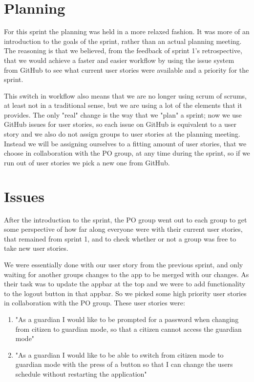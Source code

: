 \section{Planning}\label{sprint2Planning}
For this sprint the planning was held in a more relaxed fashion.
It was more of an introduction to the goals of the sprint, rather than an actual planning meeting.
The reasoning is that we believed, from the feedback of sprint 1's retrospective, that we would achieve a faster and easier workflow by using the issue system from GitHub to see what current user stories were available and a priority for the sprint.

This switch in workflow also means that we are no longer using scrum of scrums, at least not in a traditional sense, but we are using a lot of the elements that it provides.
The only "real" change is the way that we "plan" a sprint; now we use GitHub issues for user stories, so each issue on GitHub is equivalent to a user story and we also do not assign groups to user stories at the planning meeting.
Instead we will be assigning ourselves to a fitting amount of user stories, that we choose in collaboration with the PO group, at any time during the sprint, so if we run out of user stories we pick a new one from GitHub.

\section{Issues}\label{sprint2planstories}
After the introduction to the sprint, the PO group went out to each group to get some perspective of how far along everyone were with their current user stories, that remained from sprint 1, and to check whether or not a group was free to take new user stories.

We were essentially done with our user story from the previous sprint, and only waiting for another groups changes to the app to be merged with our changes.
As their task was to update the appbar at the top and we were to add functionality to the logout button in that appbar.
So we picked some high priority user stories in collaboration with the PO group.
These user stories were:

\begin{enumerate}
\item "As a guardian I would like to be prompted for a password when changing from citizen to guardian mode, so that a citizen cannot access the guardian mode"
\item "As a guardian I would like to be able to switch from citizen mode to guardian mode with the press of a button so that I can change the users schedule without restarting the application"
\end{enumerate}

